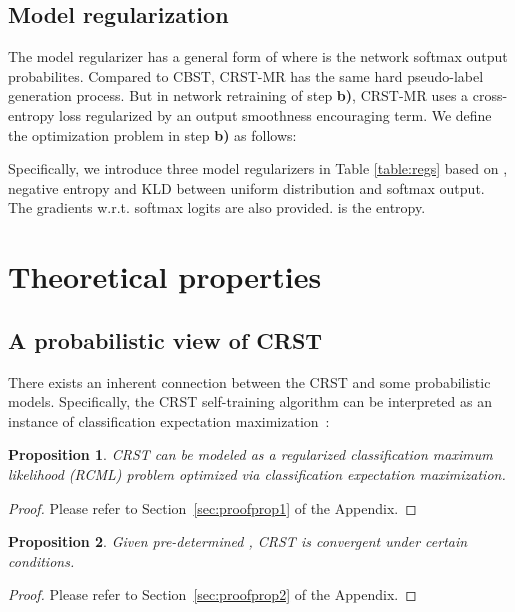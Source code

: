 \documentclass[10pt,twocolumn,letterpaper]{article}
\theoremstyle{plain}
\newtheorem{proposition}{Proposition}
\begin{document}
\subsection{Model regularization}\label{subsec:mr}
The model regularizer has a general form of   where  is the network softmax output probabilites. Compared to CBST, CRST-MR has the same hard pseudo-label generation process. But in network retraining of step \textbf{b)}, CRST-MR uses a cross-entropy loss regularized by an output smoothness encouraging term. We define the optimization problem in step \textbf{b)} as follows:


Specifically, we introduce three model regularizers in Table \ref{table:regs} based on , negative entropy and KLD between uniform distribution  and softmax output. The gradients w.r.t. softmax logits  are also provided.  is the entropy.
\begin{table}[!t]
\centering
{}
\caption{List of proposed regularizers with corresponding pseudo-label solution or gradients w.r.t. softmax logit .}
\label{table:regs}
\end{table}

\section{Theoretical properties}\label{sec:theory}
\subsection{A probabilistic view of CRST}\label{prob_explan}
There exists an inherent connection between the CRST and some probabilistic models. Specifically, the CRST self-training algorithm can be interpreted as an instance of classification expectation maximization~\cite{amini2002semi}:
\begin{proposition}\label{prop:cem}
	CRST can be modeled as a regularized classification maximum likelihood (RCML) problem optimized via classification expectation maximization.
\end{proposition}
\begin{proof}
	Please refer to Section~\ref{sec:proofprop1} of the Appendix.
\end{proof}
\begin{proposition}\label{prop:convergence}
	Given pre-determined , CRST is convergent under certain conditions.
\end{proposition}
\begin{proof}
	Please refer to Section~\ref{sec:proofprop2} of the Appendix.
\end{proof}
\end{document}
